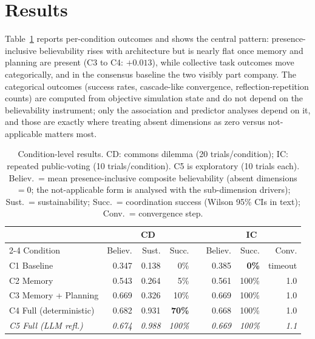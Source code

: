 \documentclass[runningheads]{llncs}
\begin{document}
\section{Results}\label{sec:results}
Table~\ref{tab:results} reports per-condition outcomes and shows the central pattern:
presence-inclusive believability rises with architecture but is nearly flat once memory and
planning are present (C3 to C4: $+0.013$), while collective task outcomes move categorically, and
in the consensus baseline the two visibly part company. The categorical outcomes (success rates,
cascade-like convergence, reflection-repetition counts) are computed from objective simulation
state and do not depend on the believability instrument; only the association and predictor
analyses depend on it, and those are exactly where treating absent dimensions as zero versus
not-applicable matters most.
\begin{table}[t]
\centering
\caption{Condition-level results. CD: commons dilemma (20 trials/condition); IC: repeated
public-voting (10 trials/condition). C5 is exploratory (10 trials each). Believ.\ = mean
presence-inclusive composite believability (absent dimensions $=0$; the not-applicable form is
analysed with the sub-dimension drivers); Sust.\ = sustainability; Succ.\ = coordination success
(Wilson 95\% CIs in text); Conv.\ = convergence step.}
\label{tab:results}
\small
\setlength{\tabcolsep}{4.5pt}
\begin{tabular}{l rrr c rrr}
\toprule
 & \multicolumn{3}{c}{CD} & & \multicolumn{3}{c}{IC} \\
\cmidrule{2-4}\cmidrule{6-8}
Condition & Believ. & Sust. & Succ. & & Believ. & Succ. & Conv. \\
\midrule
C1 Baseline           & 0.347 & 0.138 & 0\%   & & 0.385 & \textbf{0\%} & timeout \\
C2 Memory             & 0.543 & 0.264 & 5\%   & & 0.561 & 100\% & 1.0 \\
C3 Memory + Planning  & 0.669 & 0.326 & 10\%  & & 0.669 & 100\% & 1.0 \\
C4 Full (deterministic) & 0.682 & 0.931 & \textbf{70\%} & & 0.668 & 100\% & 1.0 \\
\emph{C5 Full (LLM refl.)} & \emph{0.674} & \emph{0.988} & \emph{100\%} & & \emph{0.669} & \emph{100\%} & \emph{1.1} \\
\bottomrule
\end{tabular}
\end{table}
\end{document}
